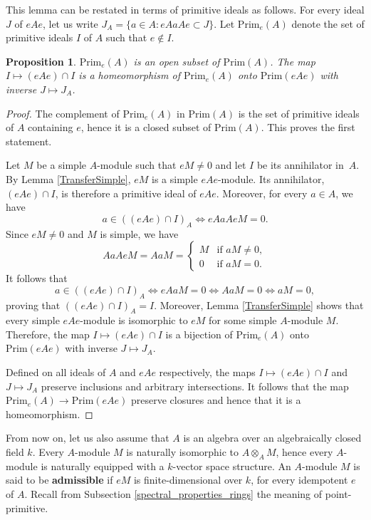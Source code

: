 \documentclass{amsart}
\newtheorem{proposition}[theorem]{Proposition}
\theoremstyle{definition}
\begin{document}
This lemma can be restated in terms of primitive ideals as follows. For every ideal $J$ of $eAe$, let us write $J_A = \{ a \in A : eAaAe \subset J\}$. Let $\mathrm{Prim}_e(A)$ denote the set of primitive ideals $I$ of $A$ such that $e \notin I$.

\begin{proposition}\label{TransferPrimitive}
    $\mathrm{Prim}_e(A)$ is an open subset of $\mathrm{Prim}(A)$. The map $I \mapsto (eAe)\cap I$ is a homeomorphism of $\mathrm{Prim}_e(A)$ onto $\mathrm{Prim}(eAe)$ with inverse $J \mapsto J_A$.
\end{proposition}

\begin{proof}
    The complement of $\mathrm{Prim}_e(A)$ in $\mathrm{Prim}(A)$ is the set of primitive ideals of $A$ containing $e$, hence it is a closed subset of $\mathrm{Prim}(A)$. This proves the first statement.
    
    Let $M$ be a simple $A$-module such that $eM \neq 0$ and let $I$ be its annihilator in~$A$. By Lemma \ref{TransferSimple}, $eM$ is a simple $eAe$-module. Its annihilator, $(eAe)\cap I$, is therefore a primitive ideal of $eAe$. Moreover, for every $a \in A$, we have
    \[a \in ((eAe) \cap I)_A \iff eAaAe M = 0.\]
    Since $eM \neq 0$ and $M$ is simple, we have
    \[AaAeM = AaM = \begin{cases}
        M & \text{if $aM \neq 0$},\\
        0 & \text{if $aM = 0$}.
    \end{cases}\]
    It follows that
    \[a \in ((eAe) \cap I)_A \iff eAaM = 0 \iff AaM = 0 \iff aM = 0,\]
    proving that $((eAe)\cap I)_A = I$. Moreover, Lemma \ref{TransferSimple} shows that every simple $eAe$-module is isomorphic to $eM$ for some simple $A$-module $M$. Therefore, the map $I \mapsto (eAe)\cap I$ is a bijection of $\mathrm{Prim}_e(A)$ onto $\mathrm{Prim}(eAe)$ with inverse $J \mapsto J_A$.
    
    Defined on all ideals of $A$ and $eAe$ respectively, the maps $I \mapsto (eAe)\cap I$ and $J \mapsto J_A$ preserve inclusions and arbitrary intersections. It follows that the map $\mathrm{Prim}_e(A) \to \mathrm{Prim}(eAe)$ preserve closures and hence that it is a homeomorphism.
\end{proof}

From now on, let us also assume that $A$ is an algebra over an algebraically closed field $k$. Every $A$-module $M$ is naturally isomorphic to $A \otimes_A M$, hence every $A$-module is naturally equipped with a $k$-vector space structure. An $A$-module $M$ is said to be \textbf{admissible} if $eM$ is finite-dimensional over $k$, for every idempotent $e$ of $A$. Recall from Subsection \ref{spectral_properties_rings} the meaning of point-primitive.
\end{document}
